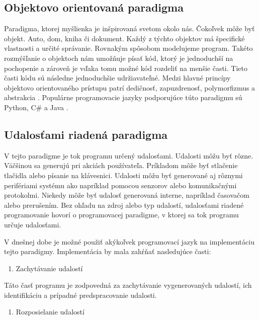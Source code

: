 \subsection{Objektovo orientovaná paradigma} \label{section:event-driven-programming}
\noindent \par
Paradigma, ktorej myšlienka je inšpirovaná svetom okolo nás. Čokoľvek môže
byť objekt. Auto, dom, kniha či dokument. Každý z týchto objektov má špecifické vlastnosti
a určité správanie. Rovnakým spôsobom modelujeme program. Takéto rozmýšľanie o
objektoch nám umožňuje písať kód, ktorý je jednoduchší na pochopenie a zároveň je
vďaka tomu možné kód rozdeliť na menšie časti. Tieto časti kódu sú následne
jednoduchšie udržiavateľné. Medzi hlavné princípy objektovo orientovaného prístupu
patrí dedičnosť, zapuzdrenosť, polymorfizmus a abstrakcia \cite{Blaschek1994}. Populárne programovacie jazyky podporujúce túto paradigmu sú Python, C\# a Java \cite
{stack-overflow-survey-2020}.

\subsection{Udalosťami riadená paradigma}
\noindent \par
V tejto paradigme je tok programu určený udalosťami. Udalosti môžu byť
rôzne. Väčšinou sa generujú pri akciách používateľa. Príkladom môže byť stlačenie tlačidla
alebo písanie na klávesnici. Udalosti môžu byť generované aj rôznymi perifériami systému ako napríklad pomocou senzorov alebo komunikačnými protokolmi. Niekedy môže byť udalosť generovaná interne, napríklad časovačom alebo prerušením. Bez ohľadu na
zdroj alebo typ udalostí, udalosťami riadené programovanie
hovorí o programovacej paradigme, v ktorej sa tok
programu určuje udalosťami.
\par V dnešnej dobe je možné použiť akýkoľvek programovací jazyk na implementáciu tejto paradigmy. Implementácia by mala zahŕňať nasledujúce časti:
\begin{enumerate}
  \item Zachytávanie udalostí
\end{enumerate}

\noindent \par
Táto časť programu je zodpovedná za zachytávanie vygenerovaných udalostí, ich identifikáciu a prípadné predspracovanie udalosti.

\begin{enumerate}[resume]
  \item Rozposielanie udalostí
\end{enumerate}

